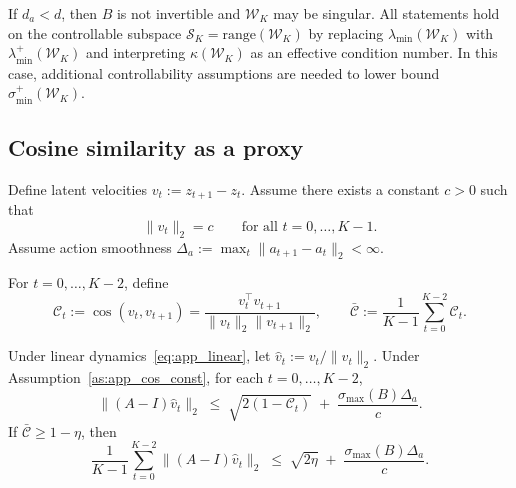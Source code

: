 \begin{remark}\label{rem:app_lowdim}
If $d_a<d$, then $B$ is not invertible and $\mathcal W_K$ may be singular.
All statements hold on the controllable subspace
$\mathcal S_K=\mathrm{range}(\mathcal W_K)$ by replacing $\lambda_{\min}(\mathcal W_K)$ with
$\lambda_{\min}^+(\mathcal W_K)$ and interpreting $\kappa(\mathcal W_K)$ as an effective condition number.
In this case, additional controllability assumptions are needed to lower bound $\sigma_{\min}^+(\mathcal W_K)$.
\end{remark}

\subsection{Cosine similarity as a proxy}
\label{app:theory_cos}

\begin{assumption}\label{as:app_cos_const}
Define latent velocities $v_t:=z_{t+1}-z_t$. Assume there exists a constant $c>0$ such that
\[
\|v_t\|_2=c\qquad \text{for all } t=0,\dots,K-1.
\]
Assume action smoothness $\Delta_a:=\max_{t}\|a_{t+1}-a_t\|_2<\infty$.
\end{assumption}

\begin{definition}\label{def:app_cos}
For $t=0,\dots,K-2$, define
\[
\mathcal C_t:=\cos(v_t,v_{t+1})
=\frac{v_t^\top v_{t+1}}{\|v_t\|_2\|v_{t+1}\|_2},
\qquad
\bar{\mathcal C}:=\frac{1}{K-1}\sum_{t=0}^{K-2}\mathcal C_t.
\]
\end{definition}

\begin{proposition}\label{prop:app_cos}
Under linear dynamics~\eqref{eq:app_linear}, let $\hat v_t:=v_t/\|v_t\|_2$.
Under Assumption~\ref{as:app_cos_const}, for each $t=0,\dots,K-2$,
\begin{equation}\label{eq:app_dir_point_const}
\|(A-I)\hat v_t\|_2
\;\le\;
\sqrt{2(1-\mathcal C_t)}
\;+\;
\frac{\sigma_{\max}(B)\Delta_a}{c}.
\end{equation}
If $\bar{\mathcal C}\ge 1-\eta$, then
\begin{equation}\label{eq:app_dir_avg_const}
\frac{1}{K-1}\sum_{t=0}^{K-2}\|(A-I)\hat v_t\|_2
\;\le\;
\sqrt{2\eta}
\;+\;
\frac{\sigma_{\max}(B)\Delta_a}{c}.
\end{equation}
\end{proposition}

